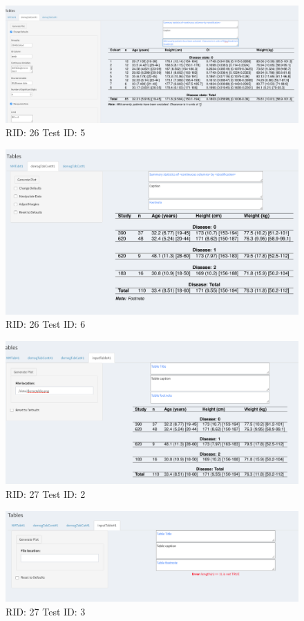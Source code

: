 \documentclass{article}
\begin{document}
\begin{figure}[H]
\includegraphics[width=.8\textwidth]{screencaps/26-5-1.png}
\caption{RID: 26 Test ID: 5}
\end{figure}

\begin{figure}[H]
\includegraphics[width=.8\textwidth]{screencaps/26-6-1.png}
\caption{RID: 26 Test ID: 6}
\end{figure}

\begin{figure}[H]
\includegraphics[width=.8\textwidth]{screencaps/27-2-1.png}
\caption{RID: 27 Test ID: 2}
\end{figure}

\begin{figure}[H]
\includegraphics[width=.8\textwidth]{screencaps/27-3-1.png}
\caption{RID: 27 Test ID: 3}
\end{figure}
\end{document}
